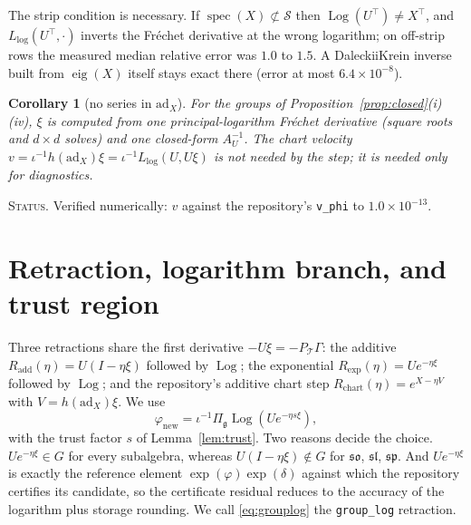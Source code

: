 \documentclass[11pt]{article}
\newtheorem{corollary}[theorem]{Corollary}
\theoremstyle{definition}
\theoremstyle{remark}
\newcommand{\g}{\mathfrak{g}}
\newcommand{\ad}{\mathrm{ad}}
\newcommand{\Log}{\operatorname{Log}}
\newcommand{\spec}{\operatorname{spec}}
\newcommand{\ndash}{\textendash}
\newcommand{\status}[1]{\par\smallskip\noindent\textsc{Status.} #1\par\smallskip}
\begin{document}
The strip condition is necessary. If $\spec(X)\not\subset\mathcal{S}$ then $\Log(U^\top)\neq X^\top$, and $L_{\log}(U^\top,\cdot)$ inverts the Fr\'echet derivative at the wrong logarithm; on off-strip rows the measured median relative error was $1.0$ to $1.5$. A Daleckii\ndash Krein inverse built from $\operatorname{eig}(X)$ itself stays exact there (error at most $6.4\times10^{-8}$).

\begin{corollary}[no series in $\ad_X$]\label{cor:nodexp}
For the groups of Proposition~\ref{prop:closed}(i)\ndash(iv), $\xi$ is computed from one principal-logarithm Fr\'echet derivative (square roots and $d\times d$ solves) and one closed-form $A_U^{-1}$. The chart velocity $v=\iota^{-1}h(\ad_X)\xi=\iota^{-1}L_{\log}(U,U\xi)$ is not needed by the step; it is needed only for diagnostics.
\end{corollary}
\status{Verified numerically: $v$ against the repository's \texttt{v\_phi} to $1.0\times10^{-13}$.}

\section{Retraction, logarithm branch, and trust region}\label{sec:retraction}

Three retractions share the first derivative $-U\xi=-P_\mathcal{T}\Gamma$: the additive $R_{\mathrm{add}}(\eta)=U(I-\eta\xi)$ followed by $\Log$; the exponential $R_{\exp}(\eta)=Ue^{-\eta\xi}$ followed by $\Log$; and the repository's additive chart step $R_{\mathrm{chart}}(\eta)=e^{X-\eta V}$ with $V=h(\ad_X)\xi$. We use
\begin{equation}\label{eq:grouplog}
\varphi_{\mathrm{new}}=\iota^{-1}\Pi_\g\Log\left(Ue^{-\eta s\xi}\right),
\end{equation}
with the trust factor $s$ of Lemma~\ref{lem:trust}. Two reasons decide the choice. $Ue^{-\eta\xi}\in G$ for every subalgebra, whereas $U(I-\eta\xi)\notin G$ for $\mathfrak{so}$, $\mathfrak{sl}$, $\mathfrak{sp}$. And $Ue^{-\eta\xi}$ is exactly the reference element $\exp(\varphi)\exp(\delta)$ against which the repository certifies its candidate, so the certificate residual reduces to the accuracy of the logarithm plus storage rounding. We call \eqref{eq:grouplog} the \texttt{group\_log} retraction.
\end{document}
